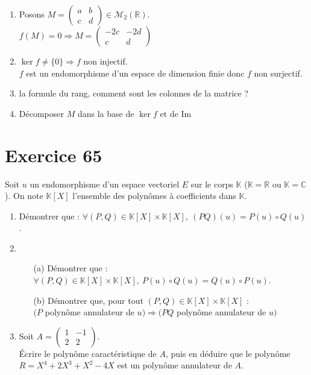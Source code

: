 \documentclass[a4paper,12pt,oneside]{book}
\newenvironment{statement}{\begin{statementbox}}{\end{statementbox}}
\newenvironment{solution}{\begin{solutionbox}}{\end{solutionbox}}
\begin{document}
	\begin{solution}
		\begin{enumerate}
			\item Posons $M = \begin{pmatrix} a & b \\ c & d \end{pmatrix} \in \mathcal{M}_2(\mathbb{R})$.\\
			$f(M) = 0 \Rightarrow M = \begin{pmatrix} -2c & -2d \\ c & d \end{pmatrix}$
			\item $\ker f \ne \{0\} \Rightarrow f$ non injectif.\\
			$f$ est un endomorphisme d’un espace de dimension finie donc $f$ non surjectif.
			\item la formule du rang, comment sont les colonnes de la matrice ?
			\item Décomposer $M$ dans la base de \(\ker f\) et de \(\mathrm{Im}\)
		\end{enumerate}
	\end{solution}

\section*{Exercice 65}

\begin{statement}
	Soit $u$ un endomorphisme d’un espace vectoriel $E$ sur le corps $\mathbb{K}$ ($\mathbb{K} = \mathbb{R}$ ou $\mathbb{K} = \mathbb{C}$). On note $\mathbb{K}[X]$ l’ensemble des polynômes à coefficients dans $\mathbb{K}$.
	\begin{enumerate}
		\item Démontrer que : $\forall (P,Q) \in \mathbb{K}[X] \times \mathbb{K}[X],\ (PQ)(u) = P(u) \circ Q(u)$.
		\item 
		\begin{itemize}
			\item[(a)] Démontrer que : $\forall (P,Q) \in \mathbb{K}[X] \times \mathbb{K}[X],\ P(u) \circ Q(u) = Q(u) \circ P(u)$.
			\item[(b)] Démontrer que, pour tout $(P,Q) \in \mathbb{K}[X] \times \mathbb{K}[X]$ :\\
			\hspace*{1em} $(P$ polynôme annulateur de $u) \Rightarrow (PQ$ polynôme annulateur de $u)$
		\end{itemize}
		\item Soit $A = \begin{pmatrix} 1 & -1 \\ 2 & 2 \end{pmatrix}$.\\
		Écrire le polynôme caractéristique de $A$, puis en déduire que le polynôme $R = X^4 + 2X^3 + X^2 - 4X$ est un polynôme annulateur de $A$.
	\end{enumerate}
\end{statement}
\end{document}
